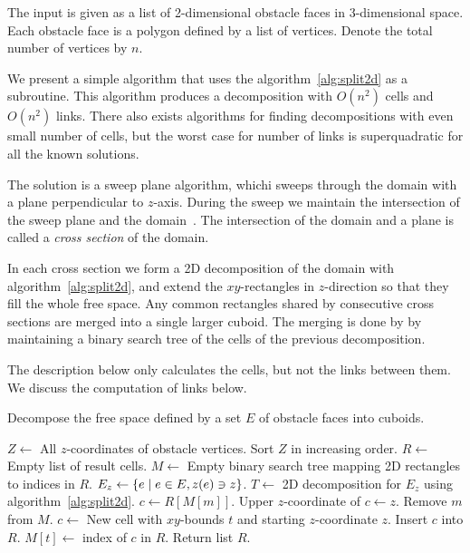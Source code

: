 \documentclass[english,gradu]{tktltiki2018}
\begin{document}
The input is given as a list of 2-dimensional obstacle faces in 3-dimensional space.
Each obstacle face is a polygon defined by a list of vertices.
Denote the total number of vertices by $n$.

We present a simple algorithm that uses the algorithm~\ref{alg:split2d} as a subroutine.
This algorithm produces a decomposition with $O(n^2)$ cells and $O(n^2)$ links.
There also exists algorithms for finding decompositions with even small number of cells, but the worst case for number of links is superquadratic for all the known solutions.

The solution is a sweep plane algorithm, whichi sweeps through the domain with a plane perpendicular to $z$-axis.
During the sweep we maintain the intersection of the sweep plane and the domain~\fspace.
The intersection of the domain and a plane is called a \emph{cross section} of the domain.

In each cross section we form a 2D decomposition of the domain with algorithm~\ref{alg:split2d}, and extend the $xy$-rectangles in $z$-direction so that they fill the whole free space.
Any common rectangles shared by consecutive cross sections are merged into a single larger cuboid.
The merging is done by by maintaining a binary search tree of the cells of the previous decomposition.

The description below only calculates the cells, but not the links between them.
We discuss the computation of links below.

\begin{alg}\label{alg:split3d}
Decompose the free space defined by a set $E$ of obstacle faces into cuboids.
\begin{algorithmic}
\State $Z\gets$ All $z$-coordinates of obstacle vertices.
\State Sort $Z$ in increasing order.
\State $R\gets$ Empty list of result cells.
\State $M\gets$ Empty binary search tree mapping 2D rectangles to indices in $R$.
	\State $E_z\gets\left\{e \mid e\in E, z(e)\ni z\right\}$.
	\State $T\gets$ 2D decomposition for $E_z$ using algorithm~\ref{alg:split2d}.
		\State $c\gets R[M[m]]$.
		\State Upper $z$-coordinate of $c\gets z$.
		\State Remove $m$ from $M$.
	\EndFor
		\State $c\gets$ New cell with $xy$-bounds $t$ and starting $z$-coordinate $z$.
		\State Insert $c$ into $R$.
		\State $M[t]\gets$ index of $c$ in $R$.
	\EndFor
\EndFor
\State Return list $R$.
\end{algorithmic}
\end{alg}
\end{document}
